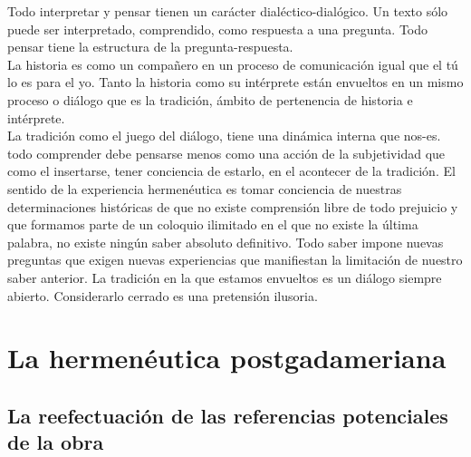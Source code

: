 \documentclass[a4paper, 11pt, twocolumn, spanish]{article}
\begin{document}
Todo interpretar y pensar tienen un carácter dialéctico-dialógico. Un
texto sólo puede ser interpretado, comprendido, como respuesta a una
pregunta. Todo pensar tiene la estructura de la pregunta-respuesta.\\[0pt]
La historia es como un compañero en un proceso de comunicación igual
que el tú lo es para el yo. Tanto la historia como su intérprete están
envueltos en un mismo proceso o diálogo que es la tradición, ámbito de
pertenencia de historia e intérprete.\\[0pt]

La tradición como el juego del diálogo, tiene una dinámica interna que
nos-es. todo comprender debe pensarse menos como una acción de la
subjetividad que como el insertarse, tener conciencia de estarlo, en
el acontecer de la tradición. El sentido de la experiencia
hermenéutica es tomar conciencia de nuestras determinaciones
históricas de que no existe comprensión libre de todo prejuicio y que
formamos parte de un coloquio ilimitado en el que no existe la última
palabra, no existe ningún saber absoluto definitivo. Todo saber impone
nuevas preguntas que exigen nuevas experiencias que manifiestan la
limitación de nuestro saber anterior. La tradición en la que estamos
envueltos es un diálogo siempre abierto. Considerarlo cerrado es una
pretensión ilusoria.

\section{La hermenéutica postgadameriana}
\label{sec:orgf59d1d8}

\subsection{La reefectuación de las referencias potenciales de la obra}
\label{sec:org8799e12}
\end{document}
